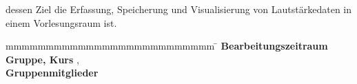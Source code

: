 \begin{titlepage}
\begin{center}
\begin{center}
{  dessen Ziel die Erfassung, Speicherung und Visualisierung von Lautstärkedaten in einem Vorlesungsraum ist.}
\end{center}
	\end{center}
	\vfill
	\begin{spacing}{1.2}
	\begin{tabbing}
		mmmmmmmmmmmmmmmmmmmmmmmmmm     \= \kill
		\textbf{Bearbeitungszeitraum}  \>  \zeitraum\\
		\textbf{Gruppe, Kurs}  \>  \martrikelnr, \kurs\\
		\textbf{Gruppenmitglieder}      \>  \firma\\
		\textbf{}              \>  \betreuer\\
	\end{tabbing}
	\end{spacing}
\end{titlepage}

